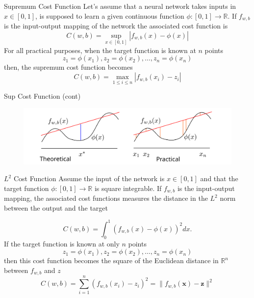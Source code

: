 \documentclass{beamer}
\begin{document}
\begin{frame}{Supremum Cost Function}
	Let's assume that a neural network takes inputs in $x\in [0,1]$, is supposed to learn a given continuous function $\phi \colon [0,1] \to \mathbb{R}$. If $f_{w,b}$ is the input-output mapping of the network the associated cost function is 
	\begin{equation*}
		C(w,b)=\sup_{x \in [0,1]} |f_{w,b}(x)-\phi(x) |
	\end{equation*}
	For all practical purposes, when the target function is known at $n$ points
	\begin{equation*}
		z_1=\phi(x_1), z_2=\phi(x_2), \ldots, z_n= \phi(x_n)
	\end{equation*}
	then, the supremum cost function becomes
	\begin{equation*}
		C(w,b)= \max_{1\le i\le n} |f_{w,b}(x_i)- z_i|
	\end{equation*}
\end{frame}

\begin{frame}{Sup Cost Function (cont)}
		\begin{figure}[h]
		\centering
		\includegraphics{../../Figures/fig_supcost.png}
	\end{figure}	
\end{frame}

\begin{frame}{$L^2$ Cost Function}
	Assume the input of the network is $x\in [0,1]$ and that the target function $\phi\colon [0,1] \to \mathbb{R}$ is square integrable. If $f_{w,b}$ is the input-output mapping, the associated cost functions measures the distance in the $L^2$ norm between the output and the target
	
	\begin{equation*}
		C(w,b)= \int_{0}^{1} (f_{w,b}(x)-\phi(x))^2 dx.
	\end{equation*}
	If the target function is known at only $n$ points
		\begin{equation*}
		z_1=\phi(x_1), z_2=\phi(x_2), \ldots, z_n= \phi(x_n)
	\end{equation*}
	then this cost function becomes the square of the Euclidean distance in $\mathbb{R}^n$ between $f_{w,b}$ and $z$
	\begin{equation*}
		C(w,b)=\sum_{i=1}^n (f_{w,b}(x_i)- z_i)^2= \| f_{w,b}(\textbf{x})-\textbf{z}\|^2
	\end{equation*}
\end{frame}
\end{document}
